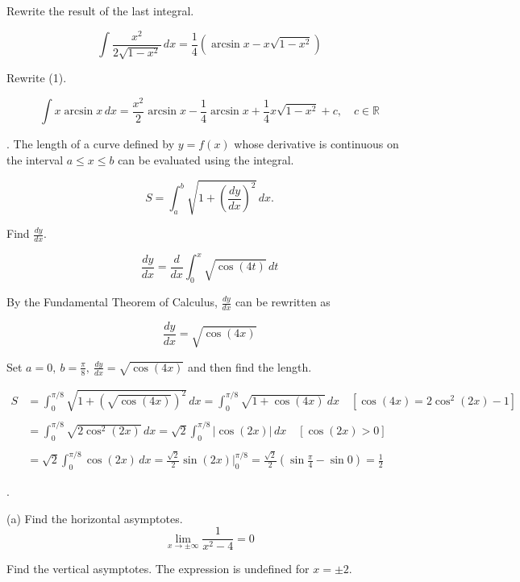 \documentclass{article}
\begin{document}
\hfill

\noindent Rewrite the result of the last integral.

\[\int\frac{x^2}{2\sqrt{1-x^2}}\,dx=\frac14\left(\arcsin x-x\sqrt{1-x^2}\right)\]

\hfill

\noindent Rewrite (1).

\[\int x\arcsin x\,dx=\boxed{\frac{x^2}2\arcsin x-\frac14\arcsin x+\frac14x\sqrt{1-x^2}+c,\quad c\in\mathbb{R}}\]

\hfill

. The length of a curve defined by $y=f(x)$ whose derivative is continuous on the interval $a\leq x\leq b$ can be evaluated using the integral.

\[S=\int_a^b\sqrt{1+\left(\frac{dy}{dx}\right)^2}\,dx.\]

\hfill

\noindent Find $\displaystyle\frac{dy}{dx}$.

\[\frac{dy}{dx}=\frac d{dx}\int_0^x\sqrt{\cos(4t)}\,dt\]

\hfill

\noindent By the Fundamental Theorem of Calculus, $\displaystyle\frac{dy}{dx}$ can be rewritten as

\hfill

\[\frac{dy}{dx}=\sqrt{\cos(4x)}\]

\hfill

\noindent Set $\displaystyle a=0,\:b=\frac\pi8,\:\frac{dy}{dx}=\sqrt{\cos(4x)}$ and then find the length.

\begin{align*}S&=\int_0^{\pi/8}\sqrt{1+\left(\sqrt{\cos(4x)}\right)^2}\,dx=\int_0^{\pi/8}\sqrt{1+\cos(4x)}\,dx\quad\left[\cos(4x)=2\cos^2(2x)-1\right]\\\\&=\int_0^{\pi/8}\sqrt{2\cos^2(2x)}\,dx=\sqrt2\int_0^{\pi/8}\left|\cos(2x)\right|\,dx\quad\left[\cos(2x)>0\right]\\\\&=\sqrt2\int_0^{\pi/8}\cos(2x)\,dx=\frac{\sqrt2}2\sin(2x)\bigg|_0^{\pi/8}=\frac{\sqrt2}2\left(\sin\frac\pi4-\sin0\right)=\boxed{\frac12}\end{align*}

.

\hfill

\noindent (a) Find the horizontal asymptotes.
\[\lim_{x\to\pm\infty}\frac{1}{x^2-4}=0\]

\hfill

\noindent Find the vertical asymptotes. The expression is undefined for $x=\pm2$.
\end{document}
